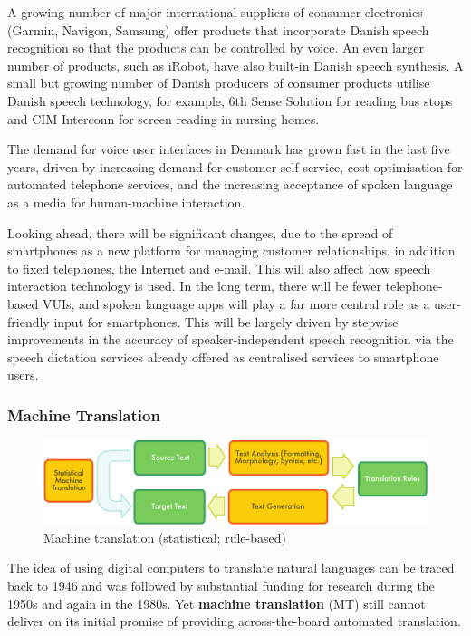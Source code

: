 \begin{multicols}{2}
A growing number of major international suppliers of consumer
electronics (Garmin, Navigon, Samsung) offer products that incorporate
Danish speech recognition so that the products can be controlled by
voice. An even larger number of products, such as iRobot, have also
built-in Danish speech synthesis. A small but growing number of Danish
producers of consumer products utilise Danish speech technology, for
example, 6th Sense Solution for reading bus stops and CIM Interconn
for screen reading in nursing homes.

The demand for voice user interfaces in Denmark has grown fast in the last five years, driven by increasing demand for customer self-service, cost optimisation for automated telephone services, and the increasing acceptance of spoken language as a media for human-machine interaction. 

Looking ahead, there will be significant changes, due to the spread of smartphones as a new platform for managing customer relationships, in addition to fixed telephones, the Internet and e-mail. This will also affect how speech interaction technology is used. In the long term, there will be fewer telephone-based VUIs, and spoken language apps will play a far more central role as a user-friendly input for smartphones. This will be largely driven by stepwise improvements in the accuracy of speaker-independent speech recognition via the speech dictation services already offered as centralised services to smartphone users.

\subsubsection{Machine Translation}

\begin{figure}[htb]
  \center
  \includegraphics[width=\textwidth]{../_media/english/machine_translation}
  \caption{Machine translation (statistical; rule-based)}
\label{fig:mtarch_en}
\end{figure}

The idea of using digital computers to translate natural languages can be traced back to 1946 and was followed by substantial funding for research during the 1950s and again in the 1980s. 
Yet \textbf{machine translation} (MT) still cannot deliver on its initial promise of providing across-the-board automated translation.  


\end{multicols}

